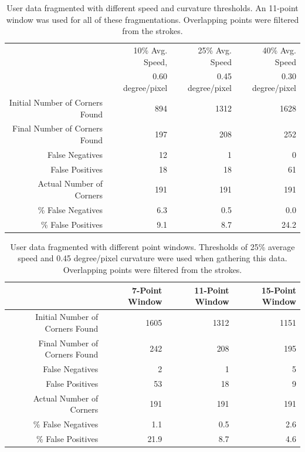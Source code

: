 \documentclass[10pt]{acmsiggraph}          %
\begin{document}
\begin{table}[p]
   \centering
   \begin{tabular}{||r||r|r|r||}
	    \hline
	    & 10\% Avg. Speed, & 25\% Avg. Speed & 40\% Avg. Speed \\
	    & 0.60 degree/pixel & 0.45 degree/pixel & 0.30 degree/pixel \\
	    \hline
	    Initial Number of Corners Found & 894 & 1312 & 1628 \\
	    \hline
	    Final Number of Corners Found & 197 & 208 & 252 \\
	    \hline 
	    False Negatives & 12 & 1 & 0 \\
	    \hline
	    False Positives & 18 & 18 & 61 \\
	    \hline
	    \hline
	    Actual Number of Corners & 191 & 191 & 191 \\
	    \hline
	    \% False Negatives & 6.3 & 0.5 & 0.0 \\
	    \hline
	    \% False Positives & 9.1 & 8.7 & 24.2 \\
	    \hline
	  \end{tabular}
	  \caption{User data fragmented with different speed and curvature thresholds. An 11-point window was used for all of these fragmentations.
	  Overlapping points were filtered from the strokes.}
	  \label{table:threshold_table}
\end{table}

\begin{table}[p]
   \centering
   \begin{tabular}{||r||r|r|r||}
	    \hline
	    & 7-Point Window & 11-Point Window & 15-Point Window \\
	    \hline 
	    Initial Number of Corners Found & 1605 & 1312 & 1151 \\
	    \hline
	    Final Number of Corners Found & 242 & 208 & 195 \\
	    \hline 
	    False Negatives & 2 & 1 & 5 \\
	    \hline
	    False Positives & 53 & 18 & 9 \\
	    \hline
	    \hline
	    Actual Number of Corners & 191 & 191 & 191 \\
	    \hline
	    \% False Negatives & 1.1 & 0.5 & 2.6 \\
	    \hline
	    \% False Positives & 21.9 & 8.7 & 4.6 \\
	    \hline
	  \end{tabular}
	  \caption{User data fragmented with different point windows. Thresholds of 25\% average speed and 0.45 degree/pixel
	  curvature were used when gathering this data. Overlapping points were filtered from the strokes.}
	  \label{table:window_table}
\end{table}
\end{document}
